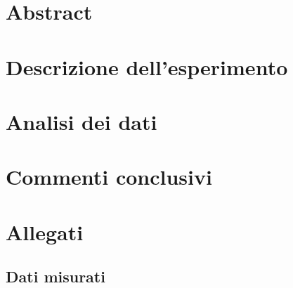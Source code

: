 \documentclass[a4paper,11pt]{article}
\begin{document}
	\tableofcontents
	
	\vspace{2cm}
	\section{Abstract}
	\newpage
	
	
	
	\section{Descrizione dell'esperimento}
	\section{Analisi dei dati}
	\section{Commenti conclusivi}
	
	
	\section{Allegati}
		\subsection{Dati misurati}
\end{document}
